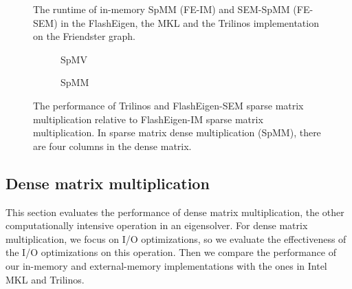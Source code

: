 \begin{figure}
	\begin{center}
		\footnotesize
		\vspace{-15pt}
		
		\vspace{-15pt}
		\caption{The runtime of in-memory SpMM (FE-IM) and SEM-SpMM (FE-SEM)
			in the FlashEigen, the MKL and the Trilinos implementation on
		the Friendster graph.}
		\label{perf:spmm}
	\end{center}
\end{figure}

\begin{figure}[t]
\centering
\footnotesize
\vspace{-15pt}
\begin{subfigure}{.5\linewidth}
	
	\vspace{-15pt}
	\caption{SpMV}
	\label{fig:spmm1}
\end{subfigure}%
\begin{subfigure}{.5\linewidth}
	
	\vspace{-15pt}
	\caption{SpMM}
	\label{fig:spmm4}
\end{subfigure}
\caption{The performance of Trilinos and FlashEigen-SEM sparse matrix
multiplication relative to FlashEigen-IM sparse matrix multiplication.
In sparse matrix dense multiplication (SpMM), there are four columns
in the dense matrix.}
\vspace{-15pt}
\label{fig:spmm}
\end{figure}

%		
%		

\subsection{Dense matrix multiplication}

This section evaluates the performance of dense matrix multiplication,
the other computationally intensive operation in an eigensolver.
For dense matrix multiplication, we focus on I/O optimizations, so we evaluate
the effectiveness of the I/O optimizations on this operation. Then we
compare the performance of our in-memory and external-memory
implementations with the ones in Intel MKL and Trilinos.

